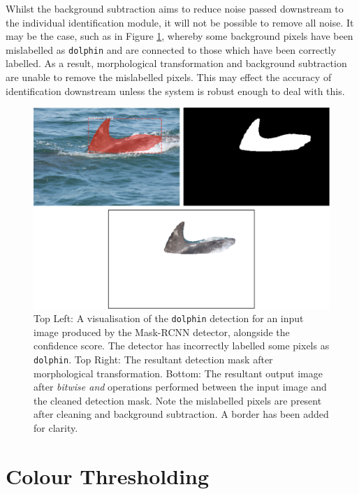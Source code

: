 Whilst the background subtraction aims to reduce noise passed downstream to the individual identification module, it will not be possible to remove all noise. It may be the case, such as in Figure \ref{fig:fin-extraction-unclean}, whereby some background pixels have been mislabelled as \texttt{dolphin} and are connected to those which have been correctly labelled. As a result, morphological transformation and background subtraction are unable to remove the mislabelled pixels. This may effect the accuracy of identification downstream unless the system is robust enough to deal with this.

\begin{figure}
	\begin{center}
		\includegraphics[scale=0.5]{Chapter4/figs/fin-extraction-unclean-uncropped.png}
	\end{center}
	\caption{Top Left: A visualisation of the \texttt{dolphin} detection for an input image produced by the Mask-RCNN detector, alongside the confidence score. The detector has incorrectly labelled some pixels as \texttt{dolphin}. Top Right: The resultant detection mask after morphological transformation. Bottom: The resultant output image after \textit{bitwise and} operations performed between the input image and the cleaned detection mask. Note the mislabelled pixels are present after cleaning and background subtraction. A border has been added for clarity.}
	\label{fig:fin-extraction-unclean}
\end{figure}

\section{Colour Thresholding}\label{ch:postProcessing,sec:colourThresholding}

